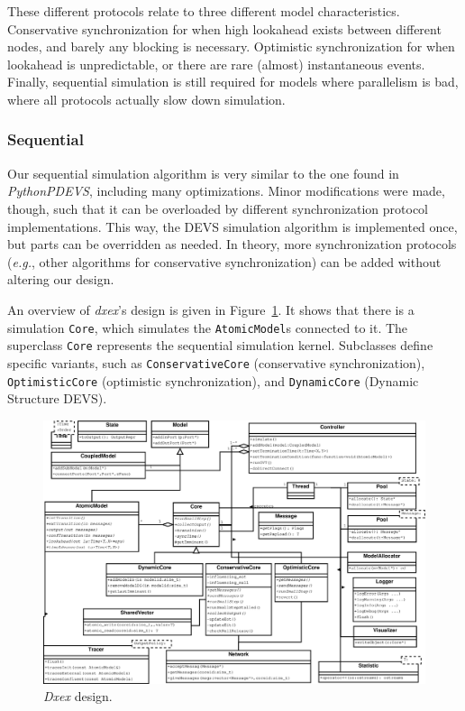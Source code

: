These different protocols relate to three different model characteristics.
Conservative synchronization for when high lookahead exists between different nodes, and barely any blocking is necessary.
Optimistic synchronization for when lookahead is unpredictable, or there are rare (almost) instantaneous events.
Finally, sequential simulation is still required for models where parallelism is bad, where all protocols actually slow down simulation.

\subsubsection{Sequential}
Our sequential simulation algorithm is very similar to the one found in \textit{PythonPDEVS}, including many optimizations.
Minor modifications were made, though, such that it can be overloaded by different synchronization protocol implementations.
This way, the \textsf{DEVS} simulation algorithm is implemented once, but parts can be overridden as needed.
In theory, more synchronization protocols (\textit{e.g.}, other algorithms for conservative synchronization) can be added without altering our design.

An overview of \textit{dxex}'s design is given in Figure~\ref{fig:class_diagram}.
It shows that there is a simulation \texttt{Core}, which simulates the \texttt{AtomicModel}s connected to it.
The superclass \texttt{Core} represents the sequential simulation kernel.
Subclasses define specific variants, such as \texttt{ConservativeCore} (conservative synchronization), \texttt{OptimisticCore} (optimistic synchronization), and \texttt{DynamicCore} (\textsf{Dynamic Structure DEVS}).

\begin{figure}
    \includegraphics[width=\textwidth]{fig/cores_class_diagram.eps}
	\caption{\textit{Dxex} design.}
	\label{fig:class_diagram}
\end{figure}

